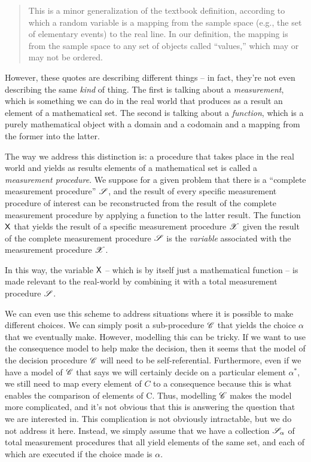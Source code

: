\begin{quote}
This is a minor generalization of the textbook definition, according to which a random variable is a mapping from the sample space (e.g., the set of elementary events) to the real line. In our definition, the mapping is from the sample space to any set of objects called ``values,'' which may or may not be ordered.
\end{quote}

However, these quotes are describing different things -- in fact, they're not even describing the same \emph{kind} of thing. The first is talking about a \emph{measurement}, which is something we can do in the real world that produces as a result an element of a mathematical set. The second is talking about a \emph{function}, which is a purely mathematical object with a domain and a codomain and a mapping from the former into the latter.

The way we address this distinction is: a procedure that takes place in the real world and yields as results elements of a mathematical set is called a \emph{measurement procedure}. We suppose for a given problem that there is a ``complete measurement procedure'' $\mathscr{S}$, and the result of every specific measurement procedure of interest can be reconstructed from the result of the complete measurement procedure by applying a function to the latter result. The function $\mathsf{X}$ that yields the result of a specific measurement procedure $\mathscr{X}$ given the result of the complete measurement procedure $\mathscr{S}$ is the \emph{variable} associated with the measurement procedure $\mathscr{X}$.

In this way, the variable $\mathsf{X}$ -- which is by itself just a mathematical function -- is made relevant to the real-world by combining it with a total measurement procedure $\mathscr{S}$.

We can even use this scheme to address situations where it is possible to make different choices. We can simply posit a sub-procedure $\mathscr{C}$ that yields the choice $\alpha$ that we eventually make. However, modelling this can be tricky. If we want to use the consequence model to help make the decision, then it seems that the model of the decision procedure $\mathscr{C}$ will need to be self-referential. Furthermore, even if we have a model of $\mathscr{C}$ that says we will certainly decide on a particular element $\alpha^*$, we still need to map every element of $C$ to a consequence because this is what enables the comparison of elements of C. Thus, modelling $\mathscr{C}$ makes the model more complicated, and it's not obvious that this is answering the question that we are interested in. This complication is not obviously intractable, but we do not address it here. Instead, we simply assume that we have a collection $\mathscr{S}_\alpha$ of total measurement procedures that all yield elements of the same set, and each of which are executed if the choice made is $\alpha$.

